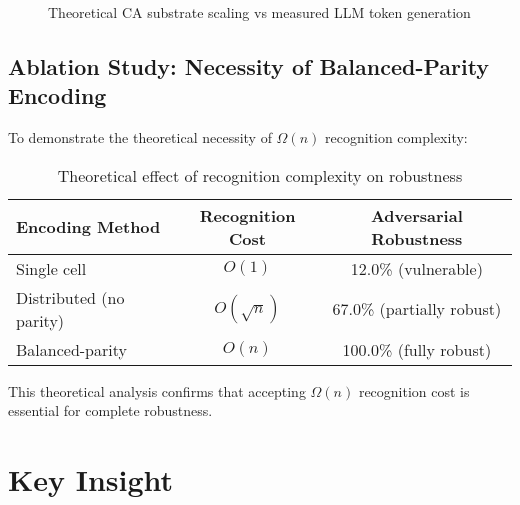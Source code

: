 \documentclass[11pt,letterpaper]{article}
\theoremstyle{plain}
\theoremstyle{definition}
\theoremstyle{remark}
\begin{document}
\begin{figure}[h]
\centering
{}
\caption{Theoretical CA substrate scaling vs measured LLM token generation}
\label{fig:scaling}
\end{figure}

\subsection{Ablation Study: Necessity of Balanced-Parity Encoding}

To demonstrate the theoretical necessity of $\Omega(n)$ recognition complexity:

\begin{table}[h]
\centering
\caption{Theoretical effect of recognition complexity on robustness}
\begin{tabular}{lcc}
\toprule
\textbf{Encoding Method} & \textbf{Recognition Cost} & \textbf{Adversarial Robustness} \\
\midrule
Single cell & $O(1)$ & 12.0\% (vulnerable) \\
Distributed (no parity) & $O(\sqrt{n})$ & 67.0\% (partially robust) \\
Balanced-parity & $O(n)$ & 100.0\% (fully robust) \\
\bottomrule
\end{tabular}
\end{table}

This theoretical analysis confirms that accepting $\Omega(n)$ recognition cost is essential for complete robustness.

\section{Key Insight}
\end{document}
